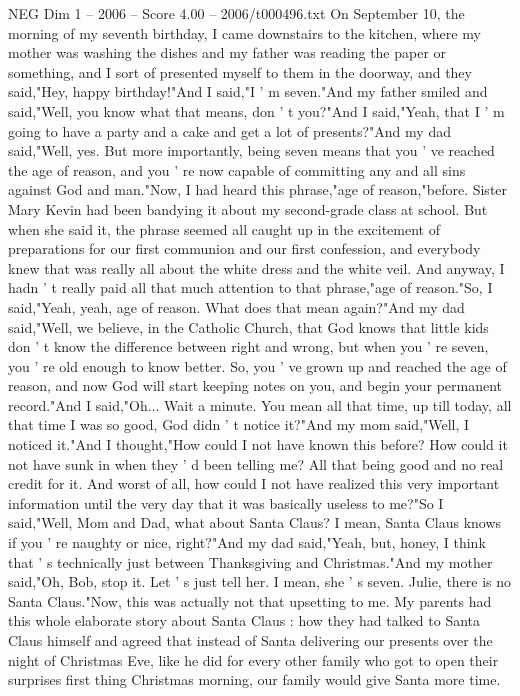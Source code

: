 \begin{textsample}{NEG Dim 1 – 2006 – Score 4.00 – 2006/t000496.txt}  \label{ex:f1_neg_069}
On September 10, the morning of my seventh birthday, I came downstairs to the kitchen, where my mother was washing the dishes and my father was reading the paper or something, and I sort of presented myself to them in the doorway, and they said,"Hey, happy birthday!"And I said,"I ' m seven."And my father smiled and said,"Well, you know what that means, don ' t you?"And I said,"Yeah, that I ' m going to have a party and a cake and get a lot of presents?"And my dad said,"Well, yes.
But more importantly, being seven means that you ' ve reached the age of reason, and you ' re now capable of committing any and all sins against God and man."Now, I had heard this phrase,"age of reason,"before.
Sister Mary Kevin had been bandying it about my second-grade class at school.
But when she said it, the phrase seemed all caught up in the excitement of preparations for our first communion and our first confession, and everybody knew that was really all about the white dress and the white veil.
And anyway, I hadn ' t really paid all that much attention to that phrase,"age of reason."So, I said,"Yeah, yeah, age of reason.
What does that mean again?"And my dad said,"Well, we believe, in the Catholic Church, that God knows that little kids don ' t know the difference between right and wrong, but when you ' re seven, you ' re old enough to know better.
So, you ' ve grown up and reached the age of reason, and now God will start keeping notes on you, and begin your permanent record."And I said,"Oh...
Wait a minute.
You mean all that time, up till today, all that time I was so good, God didn ' t notice it?"And my mom said,"Well, I noticed it."And I thought,"How could I not have known this before?
How could it not have sunk in when they ' d been telling me?
All that being good and no real credit for it.
And worst of all, how could I not have realized this very important information until the very day that it was basically useless to me?"So I said,"Well, Mom and Dad, what about Santa Claus?
I mean, Santa Claus knows if you ' re naughty or nice, right?"And my dad said,"Yeah, but, honey, I think that ' s technically just between Thanksgiving and Christmas."And my mother said,"Oh, Bob, stop it.
Let ' s just tell her.
I mean, she ' s seven.
Julie, there is no Santa Claus."Now, this was actually not that upsetting to me.
My parents had this whole elaborate story about Santa Claus : how they had talked to Santa Claus himself and agreed that instead of Santa delivering our presents over the night of Christmas Eve, like he did for every other family who got to open their surprises first thing Christmas morning, our family would give Santa more time.

\end{textsample}

